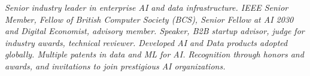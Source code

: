 {\selectfont
	\begin{justify}\textit{Senior industry leader in enterprise AI and data infrastructure. IEEE Senior Member, Fellow of British Computer Society (BCS), Senior Fellow at AI 2030 and Digital Economist, advisory member. Speaker, B2B startup advisor, judge for industry awards, technical reviewer. Developed AI and Data products adopted globally. Multiple patents in data and ML for AI. Recognition through honors and awards, and invitations to join prestigious AI organizations.}\end{justify}
}